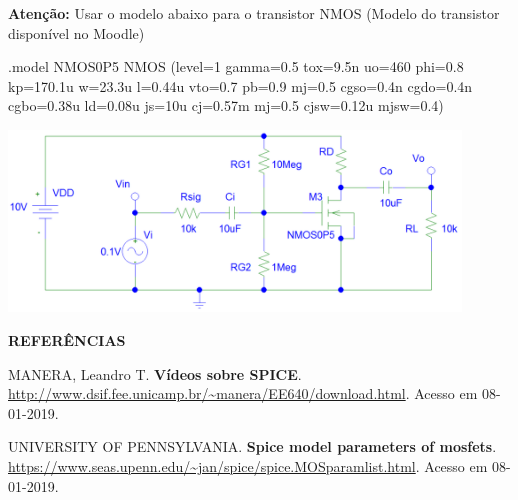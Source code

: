 \documentclass[addpoints]{exam}
\begin{document}
\begin{questions}

\textbf{Atenção:} Usar o modelo abaixo para o transistor NMOS (Modelo do transistor disponível no Moodle)

.model NMOS0P5 NMOS (level=1 gamma=0.5 tox=9.5n uo=460 phi=0.8 kp=170.1u w=23.3u l=0.44u vto=0.7 pb=0.9 mj=0.5 cgso=0.4n cgdo=0.4n cgbo=0.38u ld=0.08u js=10u cj=0.57m mj=0.5 cjsw=0.12u mjsw=0.4)

\begin{center}
\includegraphics[width=0.9\textwidth]{imagens/3.png} 
\end{center}

\vspace{5mm}

\textbf{REFERÊNCIAS}

\vspace{5mm}

MANERA, Leandro T. \textbf{Vídeos sobre SPICE}. \url{http://www.dsif.fee.unicamp.br/~manera/EE640/download.html}. Acesso em 08-01-2019.

UNIVERSITY OF PENNSYLVANIA. \textbf{Spice model parameters of mosfets}. \url{https://www.seas.upenn.edu/~jan/spice/spice.MOSparamlist.html}. Acesso em 08-01-2019.

\end{questions}
\end{document}
